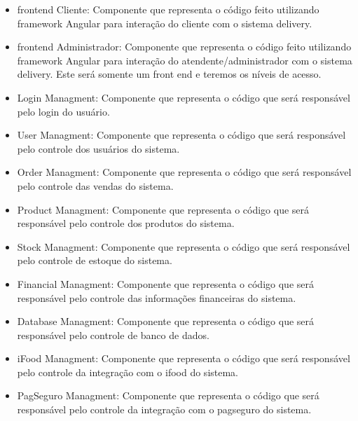   \begin{itemize}
    \item frontend Cliente: Componente que representa o código feito utilizando framework Angular para interação do cliente com o sistema delivery.
    \item frontend Administrador: Componente que representa o código feito utilizando framework Angular para interação do atendente/administrador com o sistema delivery. Este será somente um front end e teremos os níveis de acesso.
    \item Login Managment: Componente que representa o código que será responsável pelo login do usuário.
    \item User Managment: Componente que representa o código que será responsável pelo controle dos usuários do sistema.
    \item Order Managment: Componente que representa o código que será responsável pelo controle das vendas do sistema.
    \item Product Managment: Componente que representa o código que será responsável pelo controle dos produtos do sistema.
    \item Stock Managment: Componente que representa o código que será responsável pelo controle de estoque do sistema.
    \item Financial Managment: Componente que representa o código que será responsável pelo controle das informações financeiras do sistema.
    \item Database Managment: Componente que representa o código que será responsável pelo controle de banco de dados.
    \item iFood Managment: Componente que representa o código que será responsável pelo controle da integração com o ifood do sistema.
    \item PagSeguro Managment: Componente que representa o código que será responsável pelo controle da integração com o pagseguro do sistema.
  \end{itemize}